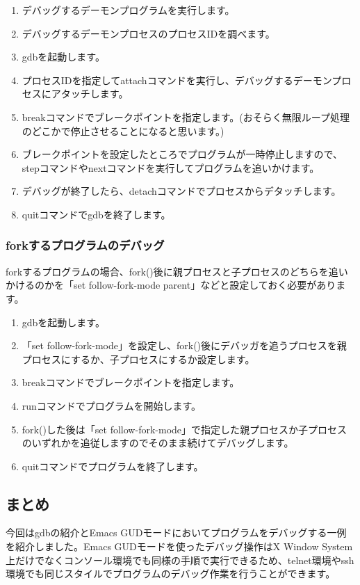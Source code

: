 \documentclass[mingoth,a4paper]{jsarticle}
\begin{document}
\begin{enumerate}
\item デバッグするデーモンプログラムを実行します。
\item デバッグするデーモンプロセスのプロセスIDを調べます。
\item gdbを起動します。
\item プロセスIDを指定してattachコマンドを実行し、デバッグするデーモンプロセスにアタッチします。
\item breakコマンドでブレークポイントを指定します。(おそらく無限ループ処理のどこかで停止させることになると思います。)
\item ブレークポイントを設定したところでプログラムが一時停止しますので、stepコマンドやnextコマンドを実行してプログラムを追いかけます。
\item デバッグが終了したら、detachコマンドでプロセスからデタッチします。
\item quitコマンドでgdbを終了します。
\end{enumerate}

\subsubsection{forkするプログラムのデバッグ}
forkするプログラムの場合、fork()後に親プロセスと子プロセスのどちらを追いかけるのかを「set follow-fork-mode parent」などと設定しておく必要があります。

\begin{enumerate}
\item gdbを起動します。
\item 「set follow-fork-mode」を設定し、fork()後にデバッガを追うプロセスを親プロセスにするか、子プロセスにするか設定します。
\item breakコマンドでブレークポイントを指定します。
\item runコマンドでプログラムを開始します。
\item fork()した後は「set follow-fork-mode」で指定した親プロセスか子プロセスのいずれかを追従しますのでそのまま続けてデバッグします。
\item quitコマンドでプログラムを終了します。
\end{enumerate}

\subsection{まとめ}
今回はgdbの紹介とEmacs GUDモードにおいてプログラムをデバッグする一例を紹介しました。Emacs GUDモードを使ったデバッグ操作はX Window System上だけでなくコンソール環境でも同様の手順で実行できるため、telnet環境やssh環境でも同じスタイルでプログラムのデバッグ作業を行うことができます。
\end{document}
